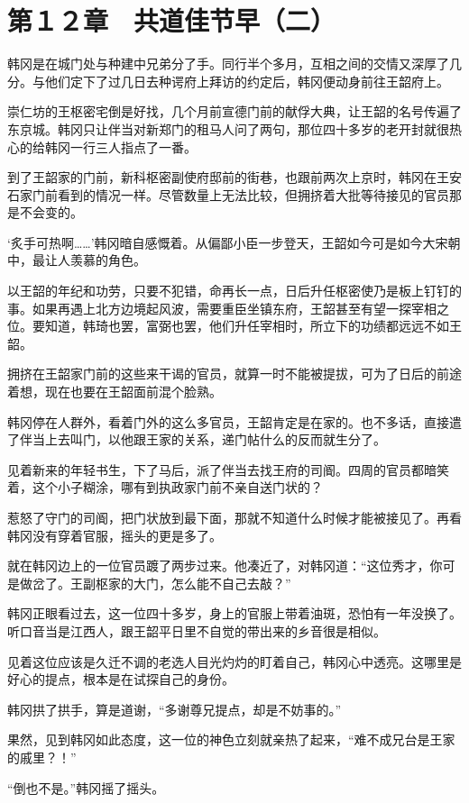 \section{第１２章　共道佳节早（二）}

韩冈是在城门处与种建中兄弟分了手。同行半个多月，互相之间的交情又深厚了几分。与他们定下了过几日去种谔府上拜访的约定后，韩冈便动身前往王韶府上。

崇仁坊的王枢密宅倒是好找，几个月前宣德门前的献俘大典，让王韶的名号传遍了东京城。韩冈只让伴当对新郑门的租马人问了两句，那位四十多岁的老开封就很热心的给韩冈一行三人指点了一番。

到了王韶家的门前，新科枢密副使府邸前的街巷，也跟前两次上京时，韩冈在王安石家门前看到的情况一样。尽管数量上无法比较，但拥挤着大批等待接见的官员那是不会变的。

‘炙手可热啊……’韩冈暗自感慨着。从偏鄙小臣一步登天，王韶如今可是如今大宋朝中，最让人羡慕的角色。

以王韶的年纪和功劳，只要不犯错，命再长一点，日后升任枢密使乃是板上钉钉的事。如果再遇上北方边境起风波，需要重臣坐镇东府，王韶甚至有望一探宰相之位。要知道，韩琦也罢，富弼也罢，他们升任宰相时，所立下的功绩都远远不如王韶。

拥挤在王韶家门前的这些来干谒的官员，就算一时不能被提拔，可为了日后的前途着想，现在也要在王韶面前混个脸熟。

韩冈停在人群外，看着门外的这么多官员，王韶肯定是在家的。也不多话，直接遣了伴当上去叫门，以他跟王家的关系，递门帖什么的反而就生分了。

见着新来的年轻书生，下了马后，派了伴当去找王府的司阍。四周的官员都暗笑着，这个小子糊涂，哪有到执政家门前不亲自送门状的？

惹怒了守门的司阍，把门状放到最下面，那就不知道什么时候才能被接见了。再看韩冈没有穿着官服，摇头的更是多了。

就在韩冈边上的一位官员踱了两步过来。他凑近了，对韩冈道：“这位秀才，你可是做岔了。王副枢家的大门，怎么能不自己去敲？”

韩冈正眼看过去，这一位四十多岁，身上的官服上带着油斑，恐怕有一年没换了。听口音当是江西人，跟王韶平日里不自觉的带出来的乡音很是相似。

见着这位应该是久迁不调的老选人目光灼灼的盯着自己，韩冈心中透亮。这哪里是好心的提点，根本是在试探自己的身份。

韩冈拱了拱手，算是道谢，“多谢尊兄提点，却是不妨事的。”

果然，见到韩冈如此态度，这一位的神色立刻就亲热了起来，“难不成兄台是王家的戚里？！”

“倒也不是。”韩冈摇了摇头。

